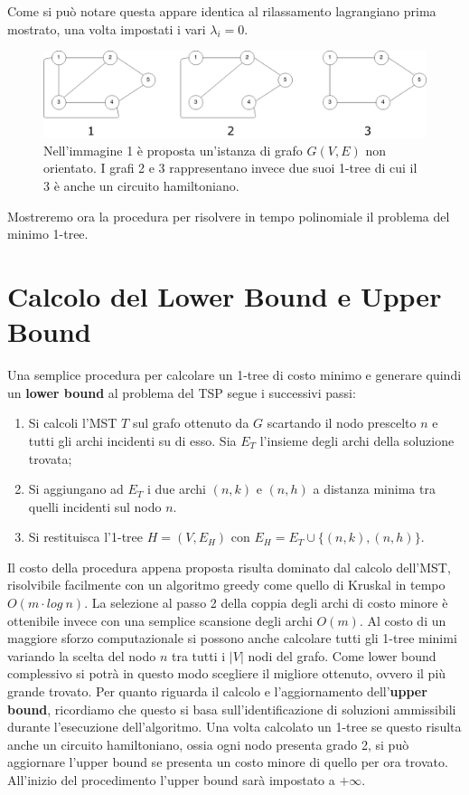 \documentclass[
	article,			%
	12pt,				%
	oneside,			%
	a4paper,			%
	english,			%
	italian,				%
	sumario=tradicional,
	]{abntex2}
\begin{document}
Come si può notare questa appare identica al rilassamento lagrangiano prima mostrato, una volta impostati i vari $\lambda_i = 0$.
\begin{figure}[h]
    \centering
    \includegraphics[scale=0.35]{files/1TreeEsempi.png}
    \caption{Nell'immagine 1 è proposta un'istanza di grafo $G(V,E)$ non orientato. I grafi 2 e 3 rappresentano invece due suoi 1-tree di cui il 3 è anche un circuito hamiltoniano.}
\end{figure}
\newline
Mostreremo ora la procedura per risolvere in tempo polinomiale il problema del minimo 1-tree.

\section{Calcolo del Lower Bound e Upper Bound}
Una semplice procedura per calcolare un 1-tree di costo minimo e generare quindi un \textbf{lower bound} al problema del TSP segue i successivi passi:
\begin{enumerate}
    \item Si calcoli l'MST $T$ sul grafo ottenuto da $G$ scartando il nodo prescelto $n$ e tutti gli archi incidenti su di esso. Sia $E_T$ l'insieme degli archi della soluzione trovata;
    \item Si aggiungano ad $E_T$ i due archi $(n,k)$ e $(n,h)$ a distanza minima tra quelli incidenti sul nodo $n$.
    \item Si restituisca l'1-tree $H = (V, E_H)$ con $E_H = E_T \cup \{(n,k),(n,h)\}$.
\end{enumerate}
Il costo della procedura appena proposta risulta dominato dal calcolo dell'MST, risolvibile facilmente con un algoritmo greedy come quello di  Kruskal in tempo $O(m\cdot log\: n)$. La selezione al passo 2 della coppia degli archi di costo minore è ottenibile invece con una semplice scansione degli archi $O(m)$.
\newline
Al costo di un maggiore sforzo computazionale si possono anche calcolare tutti gli 1-tree minimi variando la scelta del nodo $n$ tra tutti i $|V|$ nodi del grafo. Come lower bound complessivo si potrà in questo modo scegliere il migliore ottenuto, ovvero il più grande trovato.
\newline
Per quanto riguarda il calcolo e l'aggiornamento dell'\textbf{upper bound}, ricordiamo che questo si basa sull'identificazione di soluzioni ammissibili durante l'esecuzione dell'algoritmo. Una volta calcolato un 1-tree se questo risulta anche un circuito hamiltoniano, ossia ogni nodo presenta grado 2, si può aggiornare l'upper bound se presenta un costo minore di quello per ora trovato. All'inizio del procedimento l'upper bound sarà impostato a $ + \infty$. 
\end{document}
